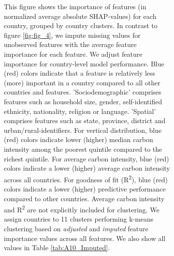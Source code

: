 \begin{figure}[ht!]
\begin{subfigure}[b]{\textwidth}
\begin{subcaption2}
    This figure shows the importance of features (in normalized average absolute SHAP-values) for each country, grouped by country clusters. In contrast to figure \ref{fig:fig_4}, we impute missing values for unobserved features with the average feature importance for each feature. We adjust feature importance for country-level model performance. Blue (red) colors indicate that a feature is relatively less (more) important in a country compared to all other countries and features. 'Sociodemographic' comprises features such as household size, gender, self-identified ethnicity, nationality, religion or language. 'Spatial' comprises features such as state, province, district and urban/rural-identifiers. For vertical distribution, blue (red) colors indicate lower (higher) median carbon intensity among the poorest quintile compared to the richest quintile. For average carbon intensity, blue (red) colors indicate a lower (higher) average carbon intensity across all countries. For goodness of fit (R\textsuperscript{2}), blue (red) colors indicate a lower (higher) predictive performance compared to other countries. Average carbon intensity and R\textsuperscript{2} are not explicitly included for clustering.
    We assign countries to 11 clusters performing k-means clustering based on \textit{adjusted} and \textit{imputed} feature importance values across all features. We also show all values in Table \ref{tab:A10_Imputed}.
    \end{subcaption2}
    \end{subfigure}
    
\end{figure}
\clearpage
